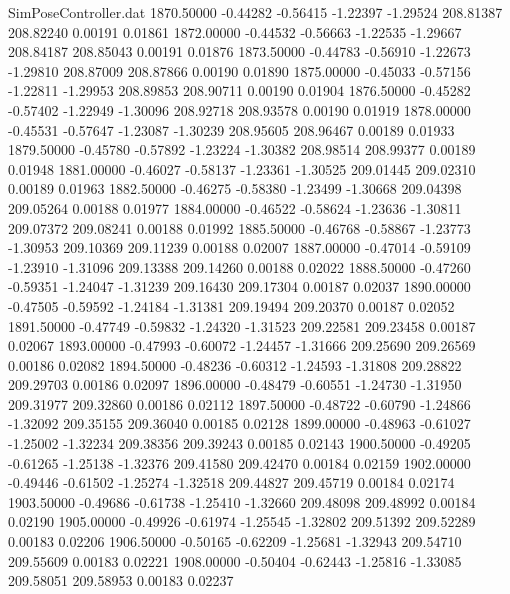 \begin{filecontents}{SimPoseController.dat}
1870.50000   -0.44282   -0.56415    -1.22397   -1.29524  208.81387  208.82240    0.00191    0.01861
1872.00000   -0.44532   -0.56663    -1.22535   -1.29667  208.84187  208.85043    0.00191    0.01876
1873.50000   -0.44783   -0.56910    -1.22673   -1.29810  208.87009  208.87866    0.00190    0.01890
1875.00000   -0.45033   -0.57156    -1.22811   -1.29953  208.89853  208.90711    0.00190    0.01904
1876.50000   -0.45282   -0.57402    -1.22949   -1.30096  208.92718  208.93578    0.00190    0.01919
1878.00000   -0.45531   -0.57647    -1.23087   -1.30239  208.95605  208.96467    0.00189    0.01933
1879.50000   -0.45780   -0.57892    -1.23224   -1.30382  208.98514  208.99377    0.00189    0.01948
1881.00000   -0.46027   -0.58137    -1.23361   -1.30525  209.01445  209.02310    0.00189    0.01963
1882.50000   -0.46275   -0.58380    -1.23499   -1.30668  209.04398  209.05264    0.00188    0.01977
1884.00000   -0.46522   -0.58624    -1.23636   -1.30811  209.07372  209.08241    0.00188    0.01992
1885.50000   -0.46768   -0.58867    -1.23773   -1.30953  209.10369  209.11239    0.00188    0.02007
1887.00000   -0.47014   -0.59109    -1.23910   -1.31096  209.13388  209.14260    0.00188    0.02022
1888.50000   -0.47260   -0.59351    -1.24047   -1.31239  209.16430  209.17304    0.00187    0.02037
1890.00000   -0.47505   -0.59592    -1.24184   -1.31381  209.19494  209.20370    0.00187    0.02052
1891.50000   -0.47749   -0.59832    -1.24320   -1.31523  209.22581  209.23458    0.00187    0.02067
1893.00000   -0.47993   -0.60072    -1.24457   -1.31666  209.25690  209.26569    0.00186    0.02082
1894.50000   -0.48236   -0.60312    -1.24593   -1.31808  209.28822  209.29703    0.00186    0.02097
1896.00000   -0.48479   -0.60551    -1.24730   -1.31950  209.31977  209.32860    0.00186    0.02112
1897.50000   -0.48722   -0.60790    -1.24866   -1.32092  209.35155  209.36040    0.00185    0.02128
1899.00000   -0.48963   -0.61027    -1.25002   -1.32234  209.38356  209.39243    0.00185    0.02143
1900.50000   -0.49205   -0.61265    -1.25138   -1.32376  209.41580  209.42470    0.00184    0.02159
1902.00000   -0.49446   -0.61502    -1.25274   -1.32518  209.44827  209.45719    0.00184    0.02174
1903.50000   -0.49686   -0.61738    -1.25410   -1.32660  209.48098  209.48992    0.00184    0.02190
1905.00000   -0.49926   -0.61974    -1.25545   -1.32802  209.51392  209.52289    0.00183    0.02206
1906.50000   -0.50165   -0.62209    -1.25681   -1.32943  209.54710  209.55609    0.00183    0.02221
1908.00000   -0.50404   -0.62443    -1.25816   -1.33085  209.58051  209.58953    0.00183    0.02237

\end{filecontents}

